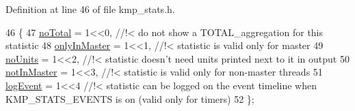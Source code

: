 Definition at line 46 of file kmp\-\_\-stats.\-h.


\begin{DoxyCode}
46                    \{
47     \hyperlink{group__STATS__GATHERING_gga438c2840cc2d516238ea3eb0f4c116b3ab0da7f248271bb150e59d37370c799b7}{noTotal}      = 1<<0,     \textcolor{comment}{//!< do not show a TOTAL\_aggregation for this statistic}
48 \textcolor{comment}{}    \hyperlink{group__STATS__GATHERING_gga438c2840cc2d516238ea3eb0f4c116b3ab1b2cd818808a4ee2cc1720286fbc51d}{onlyInMaster} = 1<<1,     \textcolor{comment}{//!< statistic is valid only for master}
49 \textcolor{comment}{}    \hyperlink{group__STATS__GATHERING_gga438c2840cc2d516238ea3eb0f4c116b3a1c30b5719af4df0bdc7206f20559c6dc}{noUnits}      = 1<<2,     \textcolor{comment}{//!< statistic doesn't need units printed next to it in output}
50 \textcolor{comment}{}    \hyperlink{group__STATS__GATHERING_gga438c2840cc2d516238ea3eb0f4c116b3a0939773e208cb608fe78bc80a4197523}{notInMaster}  = 1<<3,     \textcolor{comment}{//!< statistic is valid only for non-master threads}
51 \textcolor{comment}{}    \hyperlink{group__STATS__GATHERING_gga438c2840cc2d516238ea3eb0f4c116b3a53d50e56126850e531164b0bb1848c5e}{logEvent}     = 1<<4      \textcolor{comment}{//!< statistic can be logged on the event timeline when
       KMP\_STATS\_EVENTS is on (valid only for timers)}
52 \textcolor{comment}{}\};
\end{DoxyCode}
